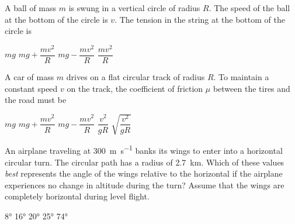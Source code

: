 \documentclass{../../oss-apphys-exam}
\begin{document}
\begin{multicols*}{2}
\begin{questions}
%      
%    
    
    \question A ball of mass $m$ is swung in a vertical circle of radius $R$.
    The speed of the ball at the bottom of the circle is $v$. The tension in
    the string at the bottom of the circle is
    \begin{choices}
      \choice $mg$
      \choice $mg+\dfrac{mv^2}R$
      \choice $mg-\dfrac{mv^2}R$
      \choice $\dfrac{mv^2}R$
    \end{choices}
    \vspace{.3in}
    
    \question A car of mass $m$ drives on a flat circular track of radius $R$.
    To maintain a constant speed $v$ on the track, the coefficient of
    friction $\mu$ between the tires and the road must be
    \begin{choices}
      \choice $mg$
      \choice $mg+\dfrac{mv^2}R$
      \choice $mg-\dfrac{mv^2}R$
      \choice $\dfrac{v^2}{gR}$
      \choice $\sqrt{\dfrac{v^2}{gR}}$
    \end{choices}
    \columnbreak
    
    \question An airplane traveling at \SI{300}{\metre\per\second} banks its
    wings to enter into a horizontal circular turn. The circular path has a
    radius of \SI{2.7}{\kilo\metre}. Which of these values \emph{best}
    represents the angle of the wings relative to the horizontal if the airplane
    experiences no change in altitude during the turn? Assume that the wings
    are completely horizontal during level flight.
    \begin{choices}
      \choice\ang{8}
      \choice\ang{16}
      \choice\ang{20}
      \choice\ang{25}
      \correctchoice\ang{74}
    \end{choices}
    

\end{questions}
\end{multicols*}
\end{document}
